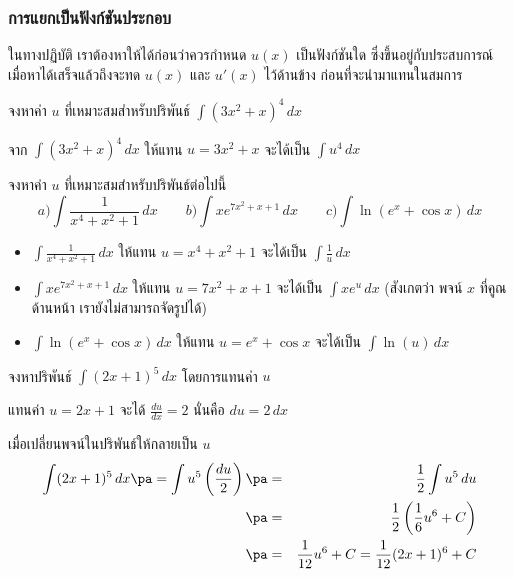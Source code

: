 \begin{frame}[t]
\frametitle{การแยกเป็นฟังก์ชันประกอบ}
ในทางปฏิบัติ เราต้องหาให้ได้ก่อนว่าควรกำหนด $u(x)$ เป็นฟังก์ชันใด ซึ่งขึ้นอยู่กับประสบการณ์ เมื่อหาได้เสร็จแล้วถึงจะทด $u(x)$ และ $u'(x)$ ไว้ด้านข้าง ก่อนที่จะนำมาแทนในสมการ
\begin{ex}
จงหาค่า $u$ ที่เหมาะสมสำหรับปริพันธ์  $ \int (3x^2+x)^4 \, dx$
\end{ex}
\begin{sol}
จาก $ \int (3x^2+x)^4 \, dx$ \pa ให้แทน $u = 3x^2 + x$ จะได้เป็น $\int u^4 \, dx$
\end{sol}
\end{frame}


\begin{frame}[t]
\begin{ex}
จงหาค่า $u$ ที่เหมาะสมสำหรับปริพันธ์ต่อไปนี้
\[a) \int \frac{1}{x^4+x^2+1} \, dx \qquad b) \int xe^{7x^2 + x + 1} \, dx \qquad c)  \int \ln (e^x + \cos x) \, dx\]
\end{ex}
\begin{sol}
\begin{itemize}
\item $ \int \frac{1}{x^4+x^2+1} \, dx$ \pa  ให้แทน $u = x^4 + x^2 + 1$ จะได้เป็น $\int \frac{1}{u} \, dx$
\item $ \int xe^{7x^2 + x + 1} \, dx$ \pa ให้แทน $u = 7x^2 + x + 1$ จะได้เป็น $\int xe^u \,dx$ (สังเกตว่า พจน์ $x$ ที่คูณด้านหน้า เรายังไม่สามารถจัดรูปได้)
\item $ \int \ln (e^x + \cos x) \, dx$ \pa ให้แทน $u = e^x + \cos x$ จะได้เป็น $\int \ln (u) \, dx$
\end{itemize}
\end{sol}
\end{frame}


\begin{frame}[t]
\begin{ex}
จงหาปริพันธ์ $\int (2x+1 )^5\,dx$ โดยการแทนค่า $u$
\end{ex}
\begin{sol}
แทนค่า $u = 2x+1$ \pa จะได้ $\frac{du}{dx} = 2$ \pa นั่นคือ $du = 2\, dx$ \pa

เมื่อเปลี่ยนพจน์ในปริพันธ์ให้กลายเป็น $u$ \pa
\begin{eqnarray*}
\int (2x+1)^5 \, dx \pa = \int u^5 \left( \frac{du}{2} \right) \pa &=& \frac{1}{2} \int u^5 \, du \\
\pa &=& \frac{1}{2} \left( \frac{1}{6} u^6 + C \right) \\
\pa &=& \frac{1}{12}u^6 + C = \frac{1}{12}(2x+1)^6 + C
\end{eqnarray*}
\end{sol}
\end{frame}

